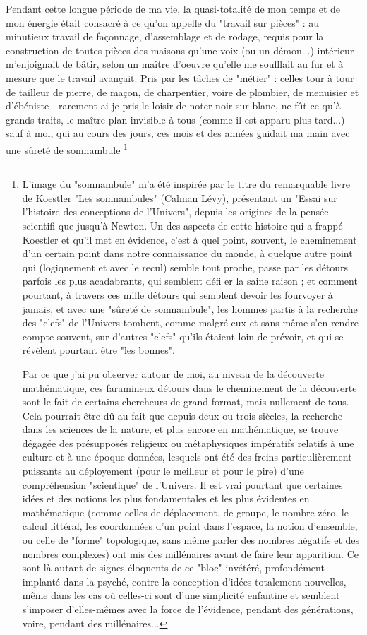 Pendant cette longue période de ma vie, la quasi-totalité de mon temps et de mon énergie était consacré à ce qu'on appelle du "travail sur pièces" : au minutieux travail de façonnage, d'assemblage et de rodage, requis pour la construction de toutes pièces des maisons qu'une voix (ou un démon...) intérieur m'enjoignait de bâtir, selon un maître d'oeuvre qu'elle me soufflait au fur et à mesure que le travail avançait. Pris par les tâches de "métier" : celles tour à tour de tailleur de pierre, de maçon, de charpentier, voire de plombier, de menuisier et d'ébéniste - rarement ai-je pris le loisir de noter noir sur blanc, ne fût-ce qu'à grands traits, le maître-plan invisible à tous (comme il est apparu plus tard...) sauf à moi, qui au cours des jours, ces mois et des années guidait ma main avec une sûreté de somnambule \footnote{L'image du "somnambule" m'a été inspirée par le titre du remarquable livre de Koestler "Les somnambules" (Calman Lévy), présentant un "Essai sur l'histoire des conceptions de l'Univers", depuis les origines de la pensée scientifi que jusqu'à Newton. Un des aspects de cette histoire qui a frappé Koestler et qu'il met en évidence, c'est à quel point, souvent, le cheminement d'un certain point dans notre connaissance du monde, à quelque autre point qui (logiquement et avec le recul) semble tout proche, passe par les détours parfois les plus acadabrants, qui semblent défi er la saine raison ; et comment pourtant, à travers ces mille détours qui semblent devoir les fourvoyer à jamais, et avec une "sûreté de somnambule", les hommes partis à la recherche des "clefs" de l'Univers tombent, comme malgré eux et sans même s'en rendre compte souvent, sur d'autres "clefs" qu'ils étaient loin de prévoir, et qui se révèlent pourtant être "les bonnes".

Par ce que j'ai pu observer autour de moi, au niveau de la découverte mathématique, ces faramineux détours dans le cheminement de la découverte sont le fait de certains chercheurs de grand format, mais nullement de tous. Cela pourrait être dû au fait que depuis deux ou trois siècles, la recherche dans les sciences de la nature, et plus encore en mathématique, se trouve dégagée des présupposés religieux ou métaphysiques impératifs relatifs à une culture et à une époque données, lesquels ont été des freins particulièrement puissants au déployement (pour le meilleur et pour le pire) d'une compréhension "scientique" de l'Univers. Il est vrai pourtant que certaines idées et des notions les plus fondamentales et les plus évidentes en mathématique (comme celles de déplacement, de groupe, le nombre zéro, le calcul littéral, les coordonnées d'un point dans l'espace, la notion d'ensemble, ou celle de "forme" topologique, sans même parler des nombres négatifs et des nombres complexes) ont mis des millénaires avant de faire leur apparition. Ce sont là autant de signes éloquents de ce "bloc" invétéré, profondément implanté dans la psyché, contre la conception d'idées totalement nouvelles, même dans les cas où celles-ci sont d'une simplicité enfantine et semblent s'imposer d'elles-mêmes avec la force de l'évidence, pendant des générations, voire, pendant des millénaires...

}

